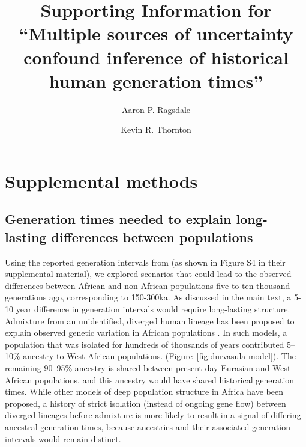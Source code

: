 \documentclass[]{article}
\title{Supporting Information for
``Multiple sources of uncertainty confound inference of
historical human generation times''}
\author[1,*]{Aaron P. Ragsdale}
\author[2]{Kevin R. Thornton}
\affil[1]{University of Wisconsin--Madison, Wisconsin, USA}
\affil[2]{University of California, Irvine, California, USA}
\affil[*]{apragsdale@wisc.edu}
\begin{document}
\maketitle

\renewcommand{\thefigure}{S\arabic{figure}}
\renewcommand{\thetable}{S\arabic{table}}
\renewcommand{\theequation}{S\arabic{equation}}
\setcounter{figure}{0}
\setcounter{table}{0}
\setcounter{equation}{0}

\section*{Supplemental methods}

\subsection*{Generation times needed to explain long-lasting differences between populations}

Using the reported generation intervals from \citet{wang2023human} (as shown in
Figure S4 in their supplemental material), we explored scenarios that could
lead to the observed differences between African and non-African populations
five to ten thousand generations ago, corresponding to 150-300ka. As discussed
in the main text, a 5-10 year difference in generation intervals would require
long-lasting structure. Admixture from an unidentified, diverged human lineage
has been proposed to explain observed genetic variation in African populations
\citep[e.g.,][but see \citet{ragsdale2022weakly} for alternative models that
allow for ongoing gene flow between
lineages]{hey2018phylogeny,durvasula2020recovering,lorente2019whole}. In such
models, a population that was isolated for hundreds of thousands of years
contributed 5--10\% ancestry to West African populations.
(Figure~\ref{fig:durvasula-model}). The remaining 90--95\% ancestry is shared
between present-day Eurasian and West African populations, and this ancestry
would have shared historical generation times. While other models of deep
population structure in Africa have been proposed, a history of strict
isolation (instead of ongoing gene flow) between diverged lineages before
admixture is more likely to result in a signal of differing ancestral
generation times, because ancestries and their associated generation intervals
would remain distinct.
\end{document}
